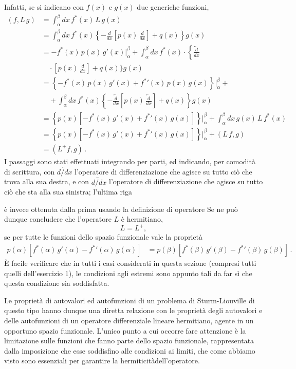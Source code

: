\documentclass[11pt, a4paper]{book}
\numberwithin{equation}{section}
\begin{document}
Infatti, se si indicano con $f(x)$ e $g(x)$ due generiche funzioni,
\begin{align*}
(f, L\, g) &= \int_\alpha^\beta dx\, f^*(x)\, L\, g(x) \\
&= \int_\alpha^\beta dx\, f^*(x) \left\{ -\frac{d}{dx}\left[p(x)\,\frac{d}{dx}\right] + q(x) \right\} g(x) \\
&= -f^*(x)\, p(x)\, g'(x) \Big|_\alpha^\beta + \int_\alpha^\beta dx\, f^*(x) \cdot \left\{ \overleftarrow{\frac{d}{dx}} \right. \\
&\quad \cdot \left[ p(x)\,\frac{d}{dx} \right] + q(x) \Big\} g(x) \\
&= \left\{ -f^*(x)\, p(x)\, g'(x) + {f^*}'(x)\, p(x)\, g(x) \right\}\Big|_\alpha^\beta + \\
&\quad + \int_\alpha^\beta dx\, f^*(x) \left\{ -\overleftarrow{\frac{d}{dx}}\left[p(x)\,\overleftarrow{\frac{d}{dx}}\right] + q(x) \right\} g(x) \\
&= \left\{ p(x)\left[-f^*(x)\, g'(x) + {f^*}'(x)\, g(x)\right] \right\}\Big|_\alpha^\beta + \int_\alpha^\beta dx\, g(x)\, L\, f^*(x) \\
&= \left\{ p(x)\left[-f^*(x)\, g'(x) + {f^*}'(x)\, g(x)\right] \right\}\Big|_\alpha^\beta + (L\, f, g) \\
&= (L^+ f, g) \,.
\end{align*}
I passaggi sono stati effettuati integrando per parti, ed indicando, per
comodità di scrittura, con $\overleftarrow{d/dx}$ l'operatore di differenziazione che agisce su tutto ciò che trova alla sua destra, e con $\overleftarrow{d/dx}$ l'operatore di differenziazione che agisce su tutto ciò che sta alla sua sinistra; l'ultima riga


è invece ottenuta dalla prima usando la definizione di operatore %
Se ne può dunque concludere che l'operatore $L$ è hermitiano,
\[
L = L^+,
\]
se per tutte le funzioni dello spazio funzionale vale la proprietà
\begin{align*}
p(\alpha)\left[f^*(\alpha)\, g'(\alpha) - {f^*}'(\alpha)\, g(\alpha)\right] &= p(\beta)\left[f^*(\beta)\, g'(\beta) - {f^*}'(\beta)\, g(\beta)\right] \,.
\end{align*}
È facile verificare che in tutti i casi considerati in questa sezione (compresi tutti quelli dell'esercizio 1), le condizioni agli estremi sono appunto tali da far sì che questa condizione sia soddisfatta.

Le proprietà di autovalori ed autofunzioni di un problema di Sturm-Liouville di questo tipo hanno dunque una diretta relazione con le proprietà
degli autovalori e delle autofunzioni di un operatore differenziale lineare
hermitiano, agente in un opportuno spazio funzionale. L'unico punto a cui
occorre fare attenzione è la limitazione sulle funzioni che fanno parte dello
spazio funzionale, rappresentata dalla imposizione che esse soddisfino
alle condizioni ai limiti, che come abbiamo visto sono essenziali per
garantire la hermiticitàdell'operatore.
\end{document}
